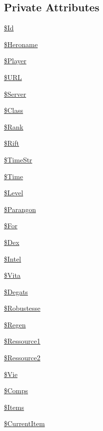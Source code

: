 \subsection*{Private Attributes}
\begin{DoxyCompactItemize}
\item 
\hyperlink{class_hero_afbbe77e56dd3f4272635d57b9c0fbd4d}{\$\+Id}
\item 
\hyperlink{class_hero_af7bc34515fabc7afcee9b31f70900a2c}{\$\+Heroname}
\item 
\hyperlink{class_hero_a4c40bc3a6de68c26160c55bcded7d6ef}{\$\+Player}
\item 
\hyperlink{class_hero_afc557e45ac39ff80d660f28862ca0abe}{\$\+U\+RL}
\item 
\hyperlink{class_hero_a2086dfaa926d3f9482623132ed4e8a5f}{\$\+Server}
\item 
\hyperlink{class_hero_a91b1c0553c6bb0d55b22481f96dc396a}{\$\+Class}
\item 
\hyperlink{class_hero_a74309a65b2f34fbbae10bb025ff71a81}{\$\+Rank}
\item 
\hyperlink{class_hero_aa978cef883608e03c9ad3f43d07cfb1b}{\$\+Rift}
\item 
\hyperlink{class_hero_a53abd21cd9bb732c42b8d1b0ed7bdb52}{\$\+Time\+Str}
\item 
\hyperlink{class_hero_ade79c15c3f3de25ebaa7f5ca6be0aacb}{\$\+Time}
\item 
\hyperlink{class_hero_af8012d95659b4bab69c98e41609fe7ee}{\$\+Level}
\item 
\hyperlink{class_hero_aac4c4823e8cb1c14ccc253fee1ebed21}{\$\+Parangon}
\item 
\hyperlink{class_hero_a2665cc5b60dff76ae00198e6e9cb6cf7}{\$\+For}
\item 
\hyperlink{class_hero_afc25317c84effc2fa4e28a2a12087a95}{\$\+Dex}
\item 
\hyperlink{class_hero_a3286b46ef8347d3e330db31bbbac9509}{\$\+Intel}
\item 
\hyperlink{class_hero_a5d3f183f7b9f737cca96b50e53be7737}{\$\+Vita}
\item 
\hyperlink{class_hero_abcc1fcf37298ca12f6beaff971933eb6}{\$\+Degats}
\item 
\hyperlink{class_hero_ad2fe803243d653c8095f44f9c1673386}{\$\+Robustesse}
\item 
\hyperlink{class_hero_a83a4506feb03a0677bdbf34787643536}{\$\+Regen}
\item 
\hyperlink{class_hero_a4ccab54e276827e9887731ec38e3e381}{\$\+Ressource1}
\item 
\hyperlink{class_hero_abdd9adaed1a8c5a03aea6a202fac5589}{\$\+Ressource2}
\item 
\hyperlink{class_hero_ac150db8e4bd48d0c85fa512b7fb213e7}{\$\+Vie}
\item 
\hyperlink{class_hero_a8a0f5e37c236c3485a3737f3d163cded}{\$\+Comps}
\item 
\hyperlink{class_hero_aacd81e22661c18c362bda653f830254b}{\$\+Items}
\item 
\hyperlink{class_hero_ac5cc35d29aa6de01c534f37ef19b6274}{\$\+Current\+Item}
\end{DoxyCompactItemize}



